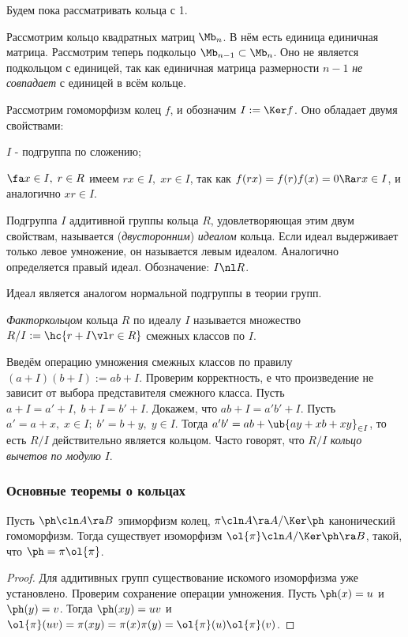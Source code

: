 \documentclass[a4paper]{article}
\begin{document}
Будем пока рассматривать кольца с 1.

\begin{ex}
Рассмотрим кольцо квадратных матриц $\Mb_n$. В нём есть единица единичная матрица. Рассмотрим теперь
подкольцо $\Mb_{n-1} \subset \Mb_n$. Оно не является подкольцом с единицей, так как единичная матрица
размерности $n-1$ \emph{не совпадает} с единицей в всём кольце.
\end{ex}

Рассмотрим гомоморфизм колец $f$, и обозначим $I := \Ker f$. Оно обладает двумя свойствами:

 $I$ - подгруппа по сложению;

 $\fa x \in I, \; r \in R$ имеем $rx \in I, \; xr \in I$, так как $f(rx)=f(r)f(x)=0 \Ra rx \in I$,  и
аналогично $xr \in I$.

\begin{df}
Подгруппа $I$ аддитивной группы кольца $R$, удовлетворяющая этим двум свойствам, называется (\emph{двусторонним}) \emph{идеалом} кольца. Если идеал
выдерживает только левое умножение, он называется левым идеалом. Аналогично определяется правый идеал. Обозначение: $I \nl R$.
\end{df}

\begin{note}
Идеал является аналогом нормальной подгруппы в теории групп.
\end{note}

\begin{df}
\emph{Факторкольцом} кольца $R$ по идеалу $I$ называется множество $R/I:=\hc{r+I \vl r \in R}$  смежных
классов по $I$.
\end{df}

Введём операцию умножения смежных классов по правилу $(a+I)(b+I):=ab+I$. Проверим корректность, е что
произведение не зависит от выбора представителя смежного класса. Пусть $a+I=a'+I, \; b+I=b'+I$. Докажем, что
$ab+I=a'b'+I$. Пусть $a'=a+x, \; x \in I; \; b' = b+y, \; y \in I$. Тогда $a'b'=ab + \ub{ay+xb+xy}_{\in I}$,
то есть $R/I$ действительно является кольцом. Часто говорят, что $R/I$ \emph{\emph{кольцо вычетов по
модулю}} $I$.

\subsubsection{Основные теоремы о кольцах}

\begin{theorem}
Пусть $\ph\cln A \ra B$ эпиморфизм колец, $\pi\cln A \ra A/\Ker \ph$ канонический гомоморфизм. Тогда
существует изоморфизм $\ol{\pi}\cln A/\Ker \ph \ra B$, такой, что $\ph = \pi \ol{\pi}$.
\end{theorem}
\begin{proof}
Для аддитивных групп существование искомого изоморфизма уже установлено. Проверим сохранение операции
умножения. Пусть $\ph(x)=u$ и $\ph(y)=v$. Тогда $\ph(xy)=uv$ и
$\ol{\pi}(uv)=\pi(xy)=\pi(x)\pi(y)=\ol{\pi}(u)\ol{\pi}(v)$.
\end{proof}
\end{document}
